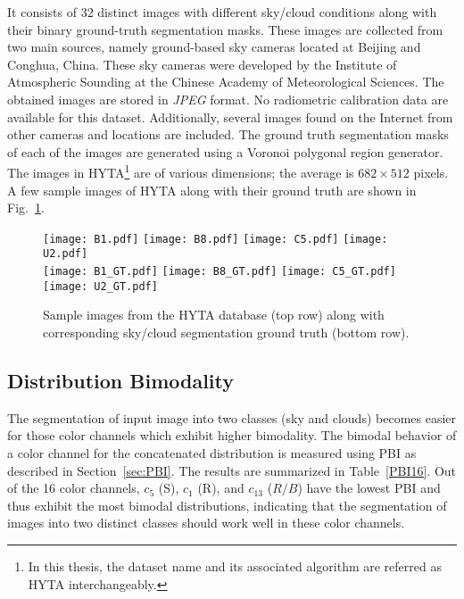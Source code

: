 It consists of $32$ distinct images with different sky/cloud conditions along with their binary ground-truth segmentation masks. These images are collected from two main sources, namely ground-based sky cameras located at Beijing and Conghua, China. These sky cameras were developed by the Institute of Atmospheric Sounding at the Chinese Academy of Meteorological Sciences. The obtained images are stored in \emph{JPEG} format. No radiometric calibration data are available for this dataset. Additionally, several images found on the Internet from other cameras and locations are included. The ground truth segmentation masks of each of the images are generated using a Voronoi polygonal region generator. The images in HYTA\footnote{In this thesis, the dataset name and its associated algorithm are referred as HYTA interchangeably.} are of various dimensions; the average is $682 \times 512$ pixels. A few sample images of HYTA along with their ground truth are shown in Fig.\ \ref{fig:sample_HYTA}.

\begin{figure}[htbp]
\centering
\texttt{[image: B1.pdf]}\hspace{0.5mm}
\texttt{[image: B8.pdf]}\hspace{0.5mm}
\texttt{[image: C5.pdf]}\hspace{0.5mm}
\texttt{[image: U2.pdf]}\\\vspace{1mm}
\texttt{[image: B1\_GT.pdf]}\hspace{0.5mm}
\texttt{[image: B8\_GT.pdf]}\hspace{0.5mm}
\texttt{[image: C5\_GT.pdf]}\hspace{0.5mm}
\texttt{[image: U2\_GT.pdf]}
\caption[Sample images from the HYTA database along with corresponding sky/cloud segmentation ground truths.]{Sample images from the HYTA database (top row) along with corresponding sky/cloud segmentation ground truth (bottom row).}
\label{fig:sample_HYTA}
\end{figure}



\subsection{Distribution Bimodality}
The segmentation of input image into two classes (sky and clouds) becomes easier for those color channels which exhibit higher bimodality. The bimodal behavior of a color channel for the concatenated distribution is measured using PBI as described in Section~\ref{sec:PBI}.  The results are summarized in Table~\ref{PBI16}. Out of the 16 color channels, $c_{5}$ (S), $c_{1}$ (R), and $c_{13}$ ($R/B$) have the lowest PBI and thus exhibit the most bimodal distributions, indicating that the segmentation of images into two distinct classes should work well in these color channels.


